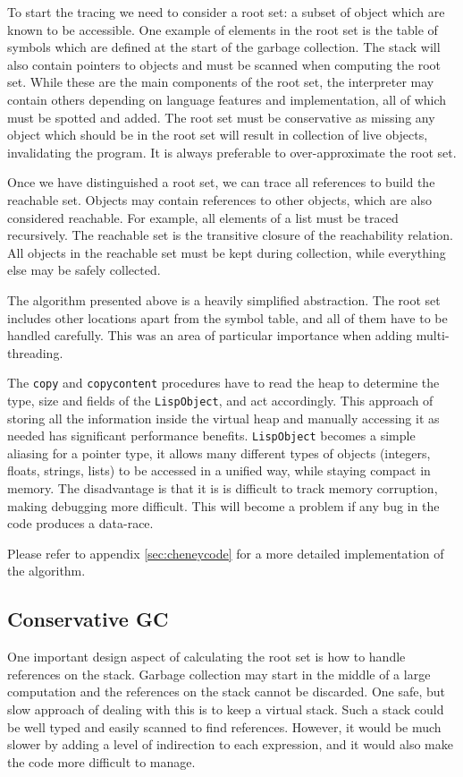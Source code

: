 To start the tracing we need to consider a root set: a subset of object which are known to be accessible.
One example of elements in the root set is the table of symbols which are defined at the start
of the garbage collection. The stack will also contain pointers to objects and must be scanned when computing the root set.
While these are the main components of the root set, the interpreter may contain others depending on language features
and implementation, all of which must be spotted and added. The root set must be conservative as missing any object which
should be in the root set will result in collection of live objects, invalidating the program. It is always
preferable to over-approximate the root set.

Once we have distinguished a root set, we can trace all references to build the reachable set. Objects may contain references
to other objects, which are also considered reachable. For example, all elements of a list must be traced recursively.
The reachable set is the transitive closure of the reachability relation. All objects in the reachable set must be kept
during collection, while everything else may be safely collected.

The algorithm presented above is a heavily simplified abstraction. The root set includes other
locations apart from the symbol table, and all of them have to be handled carefully. This was an area
of particular importance when adding multi-threading.

The \texttt{copy} and \texttt{copycontent} procedures have to read the heap to determine the type, size and fields of
the \texttt{LispObject}, and act accordingly. This approach of storing all the information inside the virtual heap
and manually accessing it as needed has significant performance benefits. \texttt{LispObject} becomes a simple aliasing
for a pointer type, it allows many different types of objects (integers, floats, strings, lists) to be accessed
in a unified way, while staying compact in memory. The disadvantage is that it is is difficult to track memory
corruption, making debugging more difficult. This will become a problem if any bug in the code produces a data-race.

Please refer to appendix \ref{sec:cheneycode} for a more detailed implementation of the algorithm.

\subsection{Conservative GC}
One important design aspect of calculating the root set is how to handle references on the stack. Garbage collection
may start in the middle of a large computation and the references on the stack cannot be discarded. One safe, but slow
approach of dealing with this is to keep a virtual stack. Such a stack could be well typed and easily scanned to find
references. However, it would be much slower by adding a level of indirection to each expression, and it would also make
the code more difficult to manage.

